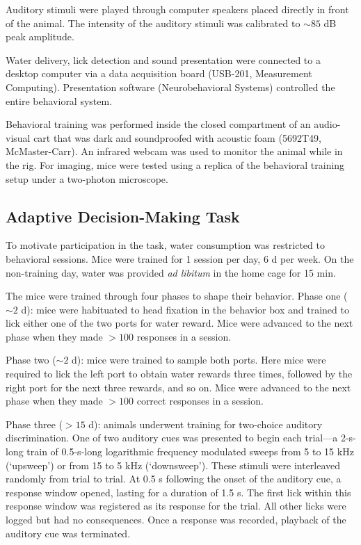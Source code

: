 Auditory stimuli were played through computer speakers placed directly in front of the animal. The intensity of the auditory stimuli was calibrated to $\sim 85$ dB peak amplitude. 

Water delivery, lick detection and sound presentation were connected to a desktop computer via a data acquisition board (USB-201, Measurement Computing). Presentation software (Neurobehavioral Systems) controlled the entire behavioral system.

Behavioral training was performed inside the closed compartment of an audio-visual cart that was dark and soundproofed with acoustic foam (5692T49, McMaster-Carr). An infrared webcam was used to monitor the animal while in the rig. For imaging, mice were tested using a replica of the behavioral training setup under a two-photon microscope.

\subsection*{Adaptive Decision-Making Task}
To motivate participation in the task, water consumption was restricted to behavioral sessions. Mice were trained for 1 session per day, 6 d per week. On the non-training day, water was provided \textit{ad libitum} in the home cage for 15 min. 

The mice were trained through four phases to shape their behavior. Phase one ($\sim 2$ d): mice were habituated to head fixation in the behavior box and trained to lick either one of the two ports for water reward. Mice were advanced to the next phase when they made $>100$ responses in a session. 

Phase two ($\sim 2$ d): mice were trained to sample both ports. Here mice were required to lick the left port to obtain water rewards three times, followed by the right port for the next three rewards, and so on. Mice were advanced to the next phase when they made $> 100$ correct responses in a session. 

Phase three ($>15$ d): animals underwent training for two-choice auditory discrimination. One of two auditory cues was presented to begin each trial---a 2-s-long train of 0.5-s-long logarithmic frequency modulated sweeps from 5 to 15 kHz (`upsweep') or from 15 to 5 kHz (`downsweep'). These stimuli were interleaved randomly from trial to trial. At 0.5 s following the onset of the auditory cue, a response window opened, lasting for a duration of 1.5 s. The first lick within this response window was registered as its response for the trial. All other licks were logged but had no consequences. Once a response was recorded, playback of the auditory cue was terminated. 

